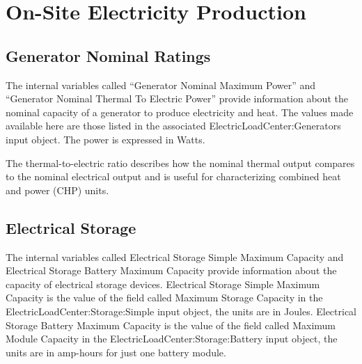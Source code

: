 \section{On-Site Electricity Production}\label{on-site-electricity-production-000}

\subsection{Generator Nominal Ratings}\label{generator-nominal-ratings}

The internal variables called ``Generator Nominal Maximum Power'' and ``Generator Nominal Thermal To Electric Power'' provide information about the nominal capacity of a generator to produce electricity and heat. The values made available here are those listed in the associated ElectricLoadCenter:Generators input object. The power is expressed in Watts.

The thermal-to-electric ratio describes how the nominal thermal output compares to the nominal electrical output and is useful for characterizing combined heat and power (CHP) units.

\subsection{Electrical Storage}\label{electrical-storage-000}

The internal variables called Electrical Storage Simple Maximum Capacity and Electrical Storage Battery Maximum Capacity provide information about the capacity of electrical storage devices. Electrical Storage Simple Maximum Capacity is the value of the field called Maximum Storage Capacity in the ElectricLoadCenter:Storage:Simple input object, the units are in Joules. Electrical Storage Battery Maximum Capacity is the value of the field called Maximum Module Capacity in the ElectricLoadCenter:Storage:Battery input object, the units are in amp-hours for just one battery module.
